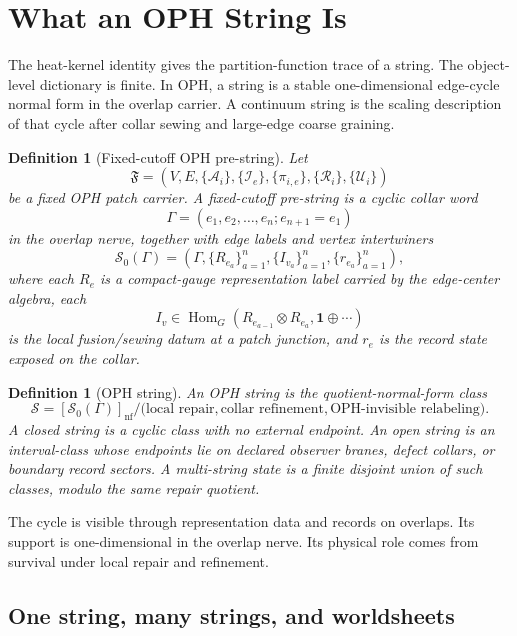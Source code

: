 \documentclass[11pt]{article}
\newtheorem{definition}[theorem]{Definition}
\theoremstyle{remark}
\theoremstyle{plain}
\newcommand{\calA}{\mathcal A}
\newcommand{\calR}{\mathcal R}
\newcommand{\calI}{\mathcal I}
\newcommand{\calU}{\mathcal U}
\begin{document}
\section{What an OPH String Is}\label{sec:oph-string-object}

The heat-kernel identity gives the partition-function trace of a string. The object-level
dictionary is finite. In OPH, a string is a stable one-dimensional edge-cycle normal form in the
overlap carrier. A continuum string is the scaling description of that cycle after collar sewing
and large-edge coarse graining.

\begin{definition}[Fixed-cutoff OPH pre-string]
Let
\[
\mathfrak F=(V,E,\{\calA_i\},\{\calI_e\},\{\pi_{i,e}\},\{\calR_i\},\{\calU_i\})
\]
be a fixed OPH patch carrier. A fixed-cutoff pre-string is a cyclic collar word
\[
\Gamma=(e_1,e_2,\ldots,e_n;e_{n+1}=e_1)
\]
in the overlap nerve, together with edge labels and vertex intertwiners
\[
\mathcal S_0(\Gamma)=
\left(\Gamma,\{R_{e_a}\}_{a=1}^n,\{I_{v_a}\}_{a=1}^n,\{r_{e_a}\}_{a=1}^n\right),
\]
where each \(R_e\) is a compact-gauge representation label carried by the edge-center algebra,
each
\[
I_v\in\operatorname{Hom}_G(R_{e_{a-1}}\otimes R_{e_a},\mathbf 1\oplus\cdots)
\]
is the local fusion/sewing datum at a patch junction, and \(r_e\) is the record state exposed on
the collar.
\end{definition}

\begin{definition}[OPH string]
An OPH string is the quotient-normal-form class
\[
\mathcal S=[\mathcal S_0(\Gamma)]_{\mathrm{nf}}/
\bigl(\text{local repair},\text{collar refinement},\text{OPH-invisible relabeling}\bigr).
\]
A closed string is a cyclic class with no external endpoint. An open string is an interval-class
whose endpoints lie on declared observer branes, defect collars, or boundary record sectors. A
multi-string state is a finite disjoint union of such classes, modulo the same repair quotient.
\end{definition}

The cycle is visible through representation data and records on overlaps. Its support is
one-dimensional in the overlap nerve. Its physical role comes from survival under local repair
and refinement.

\subsection{One string, many strings, and worldsheets}
\end{document}
